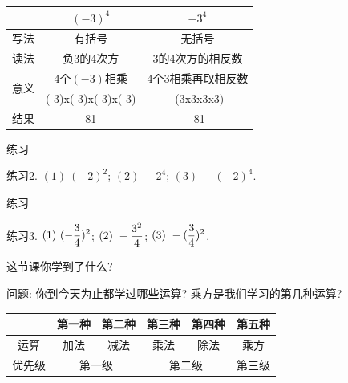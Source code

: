 \documentclass{beamer}
\begin{document}
\begin{frame}\begin{table}[htbp]\centering\begin{tabular}{l|c|c}
      \toprule      \ & $(-3)^4$ & $-3^4$ \\
      \hline\hline  写法 & 有括号 & 无括号 \\
      \hline        读法 & 负3的4次方 & 3的4次方的相反数 \\
      \hline        \multirow{2}{*}{意义} & 4个$(-3)$相乘 & 4个3相乘再取相反数 \\
                    &(-3)x(-3)x(-3)x(-3) & -(3x3x3x3)\\
      \hline       结果 & 81 & -81 \\
\bottomrule\end{tabular}\end{table}\end{frame}



\begin{frame}{练习}
  \begin{block}{练习2.}
    $(1)\ (-2)^2$; \qquad $(2)\ -2^4$; \qquad $(3)\ -(-2)^4$.
  \end{block}
\end{frame}
\begin{frame}{练习}
  \begin{block}{练习3.}
    $(1)\ \Dd(-\frac34)^2$; \qquad $(2)\ \Dd-\frac{3^2}4$; \qquad $(3)\ \Dd-(\frac34)^2$.  
  \end{block}
\end{frame}

\begin{frame}{这节课你学到了什么?}
  \begin{exampleblock}{问题:}
    你到今天为止都学过哪些运算? 乘方是我们学习的第几种运算?
  \end{exampleblock}\pause
  \begin{block}{}
    \begin{table}[htbp]\large
      \centering
      \begin{tabular}{c|c|c|c|c|c}
        \hline
        \ & 第一种 & 第二种 & 第三种 & 第四种 & 第五种\\
        \hline
        运算 & 加法 & 减法 & 乘法 & 除法 & 乘方\\
        \hline
        优先级 & \multicolumn{2}{c}{第一级} & \multicolumn{2}{c}{第二级} & 第三级\\
        \hline
      \end{tabular}
    \end{table}
  \end{block}
\end{frame}
\end{document}
